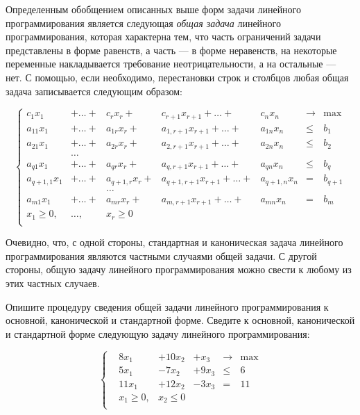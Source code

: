 Определенным обобщением описанных выше форм задачи линейного
программирования является следующая \emph{общая задача} линейного
программирования, которая характерна тем, что
  часть ограничений задачи представлены в форме равенств, а
  часть --- в форме неравенств,
   на некоторые переменные накладывается требование
  неотрицательности, а на остальные --- нет. С помощью, если необходимо,
  перестановки строк и столбцов любая общая задача записывается
  следующим образом:

\begin{equation}\label{OZLP}
\left\{
\begin{array}{ccrrrcc}
 c_1 x_1  & +  \ldots + & c_r x_r+     & c_{r+1}x_{r+1}    +\ldots +  &c_n x_n    &\to  &\max \\
 a_{11} x_1 & +  \ldots + & a_{1r} x_r+  & a_{1,r+1} x_{r+1} +\ldots +  &a_{1n} x_n &\leqslant & b_1 \\
 a_{21} x_1 & +  \ldots + & a_{2r} x_r+  & a_{2,r+1} x_{r+1} +\ldots +  &a_{2n} x_n &\leqslant & b_2 \\
                            & \ldots \\
 a_{q1} x_1 & +  \ldots + & a_{qr} x_r+  & a_{q,r+1} x_{r+1} +\ldots +  &a_{qn} x_n &\leqslant & b_q \\
 a_{q+1,1} x_1 & + \ldots + & a_{q+1,r} x_r+ & a_{q+1,r+1} x_{r+1} +\ldots + &a_{q+1,n} x_n &= & b_{q+1} \\
                            && \ldots \\
 a_{m1} x_1 & + \ldots + & a_{mr} x_r+ & a_{m,r+1} x_{r+1} +\ldots + &a_{mn} x_n &= & b_m \\
             x_1 \geqslant 0,& \ldots, \,  &x_r \geqslant 0\\
\end{array} \right.
\end{equation}



Очевидно, что, с одной стороны, стандартная и каноническая задача
линейного программирования являются частными случаями общей задачи.
С другой стороны, общую задачу линейного программирования можно
свести к любому из этих частных случаев.

\begin{exer}
Опишите процедуру сведения общей задачи линейного программирования к
основной, канонической и стандартной форме. Сведите к основной,
канонической и стандартной форме следующую задачу линейного
программирования:
\end{exer}
\begin{equation*}\label{OZLPsimple_ex}
\left\{
\begin{array}{llllllllll}
    & 8 x_1      & + 10 x_2  & +  x_3  &\to & \max\\
    & 5 x_1      & -  7 x_2  & + 9 x_3 & \leqslant  & 6 \\
    & 11 x_1     & + 12 x_2  & - 3 x_3 & =  & 11\\
    & x_1 \geqslant 0, & x_2 \leqslant 0\\
\end{array} \right.
\end{equation*}

